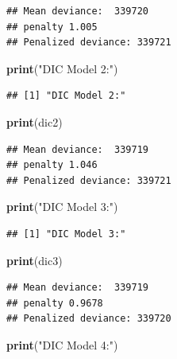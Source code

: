 \documentclass[
]{article}
\newenvironment{Shaded}{\begin{snugshade}}{\end{snugshade}}
\newcommand{\FunctionTok}[1]{\textcolor[rgb]{0.13,0.29,0.53}{\textbf{#1}}}
\newcommand{\NormalTok}[1]{#1}
\newcommand{\StringTok}[1]{\textcolor[rgb]{0.31,0.60,0.02}{#1}}
\begin{document}
\begin{verbatim}
## Mean deviance:  339720 
## penalty 1.005 
## Penalized deviance: 339721
\end{verbatim}

\begin{Shaded}
\begin{Highlighting}[]
\FunctionTok{print}\NormalTok{(}\StringTok{"DIC Model 2:"}\NormalTok{)}
\end{Highlighting}
\end{Shaded}

\begin{verbatim}
## [1] "DIC Model 2:"
\end{verbatim}

\begin{Shaded}
\begin{Highlighting}[]
\FunctionTok{print}\NormalTok{(dic2)}
\end{Highlighting}
\end{Shaded}

\begin{verbatim}
## Mean deviance:  339719 
## penalty 1.046 
## Penalized deviance: 339721
\end{verbatim}

\begin{Shaded}
\begin{Highlighting}[]
\FunctionTok{print}\NormalTok{(}\StringTok{"DIC Model 3:"}\NormalTok{)}
\end{Highlighting}
\end{Shaded}

\begin{verbatim}
## [1] "DIC Model 3:"
\end{verbatim}

\begin{Shaded}
\begin{Highlighting}[]
\FunctionTok{print}\NormalTok{(dic3)}
\end{Highlighting}
\end{Shaded}

\begin{verbatim}
## Mean deviance:  339719 
## penalty 0.9678 
## Penalized deviance: 339720
\end{verbatim}

\begin{Shaded}
\begin{Highlighting}[]
\FunctionTok{print}\NormalTok{(}\StringTok{"DIC Model 4:"}\NormalTok{)}
\end{Highlighting}
\end{Shaded}
\end{document}
